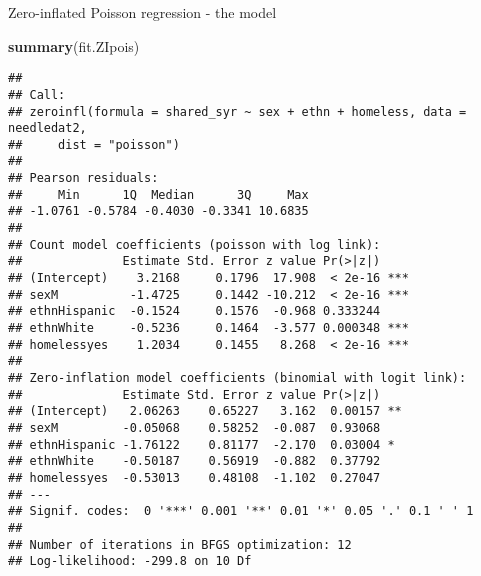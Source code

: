 \documentclass[
  ignorenonframetext,
]{beamer}
\newenvironment{Shaded}{\begin{snugshade}}{\end{snugshade}}
\newcommand{\KeywordTok}[1]{\textcolor[rgb]{0.13,0.29,0.53}{\textbf{#1}}}
\newcommand{\NormalTok}[1]{#1}
\begin{document}
\begin{frame}[fragile]{Zero-inflated Poisson regression - the model}
\protect\hypertarget{zero-inflated-poisson-regression---the-model}{}

\begin{Shaded}
\begin{Highlighting}[]
\KeywordTok{summary}\NormalTok{(fit.ZIpois)}
\end{Highlighting}
\end{Shaded}

\begin{verbatim}
## 
## Call:
## zeroinfl(formula = shared_syr ~ sex + ethn + homeless, data = needledat2, 
##     dist = "poisson")
## 
## Pearson residuals:
##     Min      1Q  Median      3Q     Max 
## -1.0761 -0.5784 -0.4030 -0.3341 10.6835 
## 
## Count model coefficients (poisson with log link):
##              Estimate Std. Error z value Pr(>|z|)    
## (Intercept)    3.2168     0.1796  17.908  < 2e-16 ***
## sexM          -1.4725     0.1442 -10.212  < 2e-16 ***
## ethnHispanic  -0.1524     0.1576  -0.968 0.333244    
## ethnWhite     -0.5236     0.1464  -3.577 0.000348 ***
## homelessyes    1.2034     0.1455   8.268  < 2e-16 ***
## 
## Zero-inflation model coefficients (binomial with logit link):
##              Estimate Std. Error z value Pr(>|z|)   
## (Intercept)   2.06263    0.65227   3.162  0.00157 **
## sexM         -0.05068    0.58252  -0.087  0.93068   
## ethnHispanic -1.76122    0.81177  -2.170  0.03004 * 
## ethnWhite    -0.50187    0.56919  -0.882  0.37792   
## homelessyes  -0.53013    0.48108  -1.102  0.27047   
## ---
## Signif. codes:  0 '***' 0.001 '**' 0.01 '*' 0.05 '.' 0.1 ' ' 1 
## 
## Number of iterations in BFGS optimization: 12 
## Log-likelihood: -299.8 on 10 Df
\end{verbatim}

\end{frame}
\end{document}
